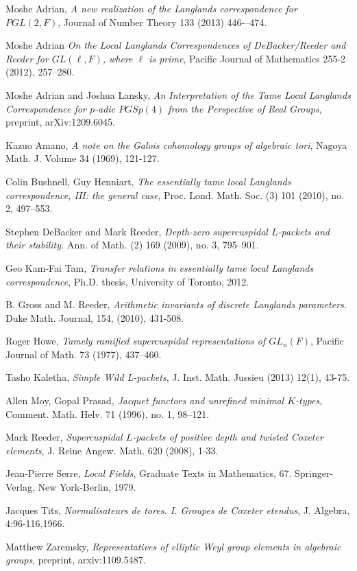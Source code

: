 \documentclass[11pt]{amsart}
\theoremstyle{plain}
\theoremstyle{definition}
\begin{document}
\begin{thebibliography}{9}

  Moshe Adrian,
  \emph{A new realization of the Langlands correspondence for $PGL(2,F)$}, Journal of Number Theory 133 (2013) 446-–474.

  Moshe Adrian
  \emph{On the Local Langlands Correspondences of DeBacker/Reeder and Reeder for $GL(\ell,F)$, where $\ell$ is prime}, Pacific Journal of Mathematics 255-2 (2012), 257--280.

  Moshe Adrian and Joshua Lansky,
  \emph{An Interpretation of the Tame Local Langlands Correspondence for $p$-adic $PGSp(4)$ from the Perspective of Real Groups}, preprint, arXiv:1209.6045.

  Kazuo Amano,
  \emph{A note on the Galois cohomology groups of algebraic tori}, Nagoya Math. J. Volume 34 (1969), 121-127.

  Colin Bushnell, Guy Henniart,
  \emph{The essentially tame local Langlands correspondence, III: the general case}, Proc. Lond. Math. Soc. (3) 101 (2010), no. 2, 497–553.

  Stephen DeBacker and Mark Reeder,
  \emph{Depth-zero supercuspidal $L$-packets and their stability.}
  Ann. of Math. (2) 169 (2009), no. 3, 795--901.

  Geo Kam-Fai Tam,
  \emph{Transfer relations in essentially tame local Langlands correspondence}, Ph.D. thesis, University of Toronto, 2012.

  B. Gross and M. Reeder,
  \emph{Arithmetic invariants of discrete Langlands parameters.}  Duke Math. Journal, 154, (2010), 431-508.

  Roger Howe,
  \emph{Tamely ramified supercuspidal representations of $GL_n(F)$},
   Pacific Journal of Math.  73  (1977),  437--460.

  Tasho Kaletha, \emph{Simple Wild L-packets}, J. Inst. Math. Jussieu (2013) 12(1), 43-75.

  Allen Moy, Gopal Prasad,
  \emph{Jacquet functors and unrefined minimal $K$-types},
   Comment. Math. Helv. 71 (1996), no. 1, 98--121.

  Mark Reeder,
  \emph{Supercuspidal $L$-packets of positive depth and twisted Coxeter elements},
  J. Reine Angew. Math. 620 (2008), 1-33.

  Jean-Pierre Serre,
  \emph{Local Fields}, Graduate Texts in Mathematics, 67. Springer-Verlag, New York-Berlin, 1979.

  Jacques Tits,
  \emph{Normalisateurs de tores. I. Groupes de Coxeter etendus}, J. Algebra, 4:96-116,1966.

  Matthew Zaremsky,
  \emph{Representatives of elliptic Weyl group elements in algebraic groups}, preprint, arxiv:1109.5487.

\end{thebibliography}
\end{document}
